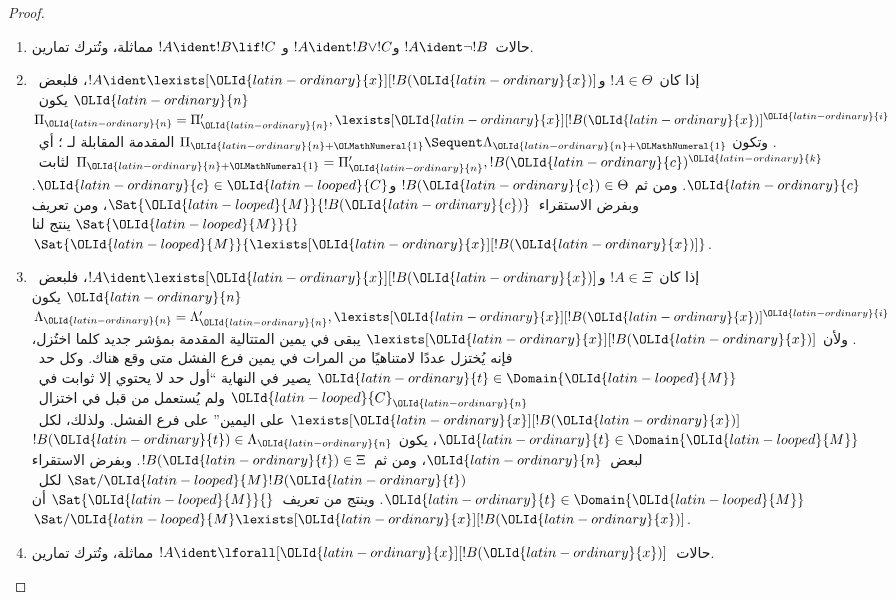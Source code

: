 \documentclass[../../../include/open-logic-section]{subfiles}
\begin{document}
\begin{proof}
\begin{enumerate}
  \item حالات~$!A\ident\lnot !B$ و$!A\ident !B\lor !C$ و
  $!A\ident !B\lif !C$ مماثلة، وتُترك تمارين.

  \item إذا كان~$!A\in\Theta$ و$!A\ident\lexists[\OLId{latin-ordinary}{x}][!B(\OLId{latin-ordinary}{x})]$، فلبعض~$\OLId{latin-ordinary}{n}$
  يكون~$\Pi_\OLId{latin-ordinary}{n}=\Pi_\OLId{latin-ordinary}{n}',\lexists[\OLId{latin-ordinary}{x}][!B(\OLId{latin-ordinary}{x})]^\OLId{latin-ordinary}{i}$. وتكون
  $\Pi_{\OLId{latin-ordinary}{n}+\OLMathNumeral{1}}\Sequent\Lambda_{\OLId{latin-ordinary}{n}+\OLMathNumeral{1}}$ المقدمة المقابلة لـ
  \LeftR{\lexists}؛ أي~$\Pi_{\OLId{latin-ordinary}{n}+\OLMathNumeral{1}}=\Pi_\OLId{latin-ordinary}{n}',!B(\OLId{latin-ordinary}{c})^\OLId{latin-ordinary}{k}$ لثابت~$\OLId{latin-ordinary}{c}$. ومن ثم
  $!B(\OLId{latin-ordinary}{c})\in\Theta$ و$\OLId{latin-ordinary}{c}\in \OLId{latin-looped}{C}$. وبفرض الاستقراء~$\Sat{\OLId{latin-looped}{M}}{!B(\OLId{latin-ordinary}{c})}$، ومن تعريف
  $\Sat{\OLId{latin-looped}{M}}{}$ ينتج لنا~$\Sat{\OLId{latin-looped}{M}}{\lexists[\OLId{latin-ordinary}{x}][!B(\OLId{latin-ordinary}{x})]}$.

  \item إذا كان~$!A\in\Xi$ و$!A\ident\lexists[\OLId{latin-ordinary}{x}][!B(\OLId{latin-ordinary}{x})]$، فلبعض~$\OLId{latin-ordinary}{n}$ يكون
  $\Lambda_\OLId{latin-ordinary}{n}=\Lambda_\OLId{latin-ordinary}{n}',\lexists[\OLId{latin-ordinary}{x}][!B(\OLId{latin-ordinary}{x})]^\OLId{latin-ordinary}{i}$. ولأن
  $\lexists[\OLId{latin-ordinary}{x}][!B(\OLId{latin-ordinary}{x})]$ يبقى في يمين المتتالية المقدمة بمؤشر جديد كلما
  اختُزل، فإنه يُختزل عددًا لامتناهيًا من المرات في يمين فرع الفشل متى وقع
  هناك. وكل حد~$\OLId{latin-ordinary}{t}\in\Domain{\OLId{latin-looped}{M}}$ يصير في النهاية ``أول حد لا يحتوي إلا
  ثوابت في~$\OLId{latin-looped}{C}_\OLId{latin-ordinary}{n}$ ولم يُستعمل من قبل في اختزال~$\lexists[\OLId{latin-ordinary}{x}][!B(\OLId{latin-ordinary}{x})]$ على
  اليمين'' على فرع الفشل. ولذلك، لكل~$\OLId{latin-ordinary}{t}\in\Domain{\OLId{latin-looped}{M}}$، يكون
  $!B(\OLId{latin-ordinary}{t})\in\Lambda_\OLId{latin-ordinary}{n}$ لبعض~$\OLId{latin-ordinary}{n}$، ومن ثم~$!B(\OLId{latin-ordinary}{t})\in\Xi$. وبفرض الاستقراء
  $\Sat/{\OLId{latin-looped}{M}}{!B(\OLId{latin-ordinary}{t})}$ لكل~$\OLId{latin-ordinary}{t}\in\Domain{\OLId{latin-looped}{M}}$. وينتج من تعريف~$\Sat{\OLId{latin-looped}{M}}{}$ أن
  $\Sat/{\OLId{latin-looped}{M}}{\lexists[\OLId{latin-ordinary}{x}][!B(\OLId{latin-ordinary}{x})]}$.

  \item حالات~$!A\ident\lforall[\OLId{latin-ordinary}{x}][!B(\OLId{latin-ordinary}{x})]$ مماثلة، وتُترك تمارين.
\end{enumerate}
\end{proof}
\end{document}
